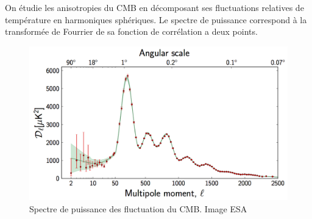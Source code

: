 On étudie les anisotropies du \ac{CMB} en décomposant ses fluctuations relatives de température en harmoniques sphériques.
Le spectre de puissance correspond à la transformée de Fourrier de sa fonction de corrélation a deux points.

%
%
%
%
%
%


\begin{figure}[bth]
        \includegraphics[width=.95\linewidth]{img/01/CMB_power_spectrum.png} 
        \caption[Spectre de puissance des fluctuation du CMB]{Spectre de puissance des fluctuation du \ac{CMB}.
        Image ESA}
 		\label{fig:cmb_power_spectrum}
\end{figure}

